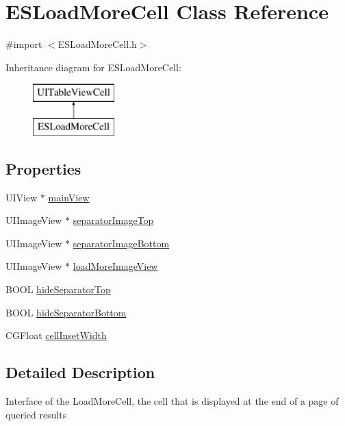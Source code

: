 \hypertarget{interface_e_s_load_more_cell}{}\section{E\+S\+Load\+More\+Cell Class Reference}
\label{interface_e_s_load_more_cell}


{\ttfamily \#import $<$E\+S\+Load\+More\+Cell.\+h$>$}

Inheritance diagram for E\+S\+Load\+More\+Cell\+:\begin{figure}[H]
\begin{center}
\leavevmode
\includegraphics[height=2.000000cm]{interface_e_s_load_more_cell}
\end{center}
\end{figure}
\subsection*{Properties}
\begin{DoxyCompactItemize}
\item 
U\+I\+View $\ast$ \hyperlink{interface_e_s_load_more_cell_a8c3e6cef63148acdf95681df8a1dbb78}{main\+View}
\item 
U\+I\+Image\+View $\ast$ \hyperlink{interface_e_s_load_more_cell_a41e315f2b8ff094f83b7584578595748}{separator\+Image\+Top}
\item 
U\+I\+Image\+View $\ast$ \hyperlink{interface_e_s_load_more_cell_aba6622fe50f0d306173f202efbf8419a}{separator\+Image\+Bottom}
\item 
U\+I\+Image\+View $\ast$ \hyperlink{interface_e_s_load_more_cell_a4ff0d702591f9ee73be8c3a609b03797}{load\+More\+Image\+View}
\item 
B\+O\+O\+L \hyperlink{interface_e_s_load_more_cell_a0beb91d7d67e8b0c30ba90f35a69a921}{hide\+Separator\+Top}
\item 
B\+O\+O\+L \hyperlink{interface_e_s_load_more_cell_a5ea5913db27906b009671c6c1b2b2e24}{hide\+Separator\+Bottom}
\item 
C\+G\+Float \hyperlink{interface_e_s_load_more_cell_a5eb451d4271ac0797582176310800d69}{cell\+Inset\+Width}
\end{DoxyCompactItemize}


\subsection{Detailed Description}
Interface of the Load\+More\+Cell, the cell that is displayed at the end of a page of queried results 

